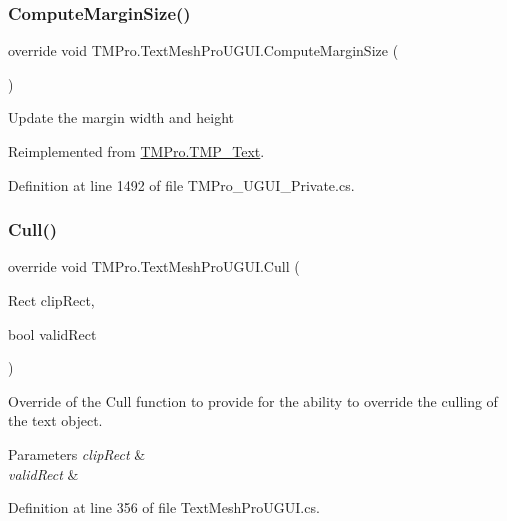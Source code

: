 \subsubsection{\texorpdfstring{ComputeMarginSize()}{ComputeMarginSize()}}
{\footnotesize\ttfamily override void T\+M\+Pro.\+Text\+Mesh\+Pro\+U\+G\+U\+I.\+Compute\+Margin\+Size (\begin{DoxyParamCaption}{ }\end{DoxyParamCaption})\hspace{0.3cm}{\ttfamily [virtual]}}



Update the margin width and height 



Reimplemented from \mbox{\hyperlink{class_t_m_pro_1_1_t_m_p___text_a9e380bad2a5506d96b7c1d3b0b12d013}{T\+M\+Pro.\+T\+M\+P\+\_\+\+Text}}.



Definition at line 1492 of file T\+M\+Pro\+\_\+\+U\+G\+U\+I\+\_\+\+Private.\+cs.

\mbox{\label{class_t_m_pro_1_1_text_mesh_pro_u_g_u_i_aa56357c3d3127f3a3662889ec65118f4}} 
\subsubsection{\texorpdfstring{Cull()}{Cull()}}
{\footnotesize\ttfamily override void T\+M\+Pro.\+Text\+Mesh\+Pro\+U\+G\+U\+I.\+Cull (\begin{DoxyParamCaption}\item[{Rect}]{clip\+Rect,  }\item[{bool}]{valid\+Rect }\end{DoxyParamCaption})}



Override of the Cull function to provide for the ability to override the culling of the text object. 


\begin{DoxyParams}{Parameters}
{\em clip\+Rect} & \\
\hline
{\em valid\+Rect} & \\
\hline
\end{DoxyParams}


Definition at line 356 of file Text\+Mesh\+Pro\+U\+G\+U\+I.\+cs.

\mbox{\label{class_t_m_pro_1_1_text_mesh_pro_u_g_u_i_af5d2e586548f3dd722fd804019261304}} 
